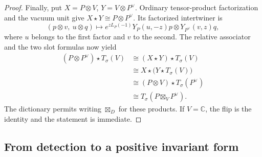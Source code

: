 \begin{proof}
Finally, put \(X=P\otimes V\), \(Y=V\otimes P^\vee\).
Ordinary tensor-product factorization and the vacuum unit give
\(X\star Y\cong P\otimes P^\vee\).  Its factorized intertwiner is
\[
 (p\otimes v,\ u\otimes q)\longmapsto
 e^{zL_P(-1)}Y_P(u,-z)p\otimes Y_{P^\vee}(v,z)q,
\]
where \(u\) belongs to the first factor and \(v\) to the second.
The relative associator and the two slot formulas now yield
\[
 \begin{aligned}
 (P\otimes P^\vee)\star T_\sigma(V)
 &\cong (X\star Y)\star T_\sigma(V)\\
 &\cong X\star\bigl(Y\star T_\sigma(V)\bigr)\\
 &\cong (P\otimes V)\star T_\sigma(P^\vee)\\
 &\cong T_\sigma(P\boxtimes_V P^\vee).
 \end{aligned}
\]
The dictionary permits writing \(\boxtimes_D\) for these products.
If \(V=\mathbb C\), the flip is the identity and the statement is
immediate.
\end{proof}

\subsection{From detection to a positive invariant form}

